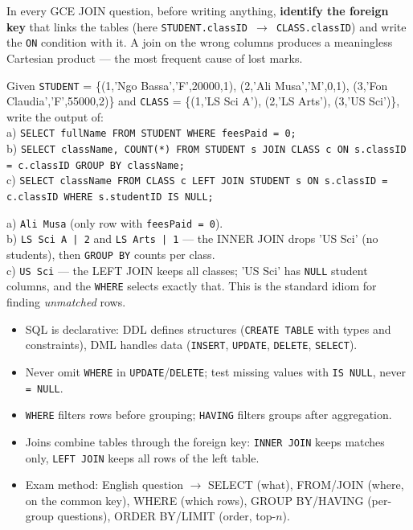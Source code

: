 \documentclass[11pt]{article}
\begin{document}
\begin{attention}
In every GCE JOIN question, before writing anything, \textbf{identify the foreign key} that links the tables (here \texttt{STUDENT.classID $\rightarrow$ CLASS.classID}) and write the \texttt{ON} condition with it. A join on the wrong columns produces a meaningless Cartesian product --- the most frequent cause of lost marks.
\end{attention}

\begin{exercice}
Given \texttt{STUDENT} = \{(1,'Ngo Bassa','F',20000,1), (2,'Ali Musa','M',0,1), (3,'Fon Claudia','F',55000,2)\} and \texttt{CLASS} = \{(1,'LS Sci A'), (2,'LS Arts'), (3,'US Sci')\}, write the output of:\\
a) \texttt{SELECT fullName FROM STUDENT WHERE feesPaid = 0;}\\
b) \texttt{SELECT className, COUNT(*) FROM STUDENT s JOIN CLASS c ON s.classID = c.classID GROUP BY className;}\\
c) \texttt{SELECT className FROM CLASS c LEFT JOIN STUDENT s ON s.classID = c.classID WHERE s.studentID IS NULL;}
\end{exercice}

\begin{corrige}[Exercise 1]
a) \texttt{Ali Musa} (only row with \texttt{feesPaid = 0}).\\
b) \texttt{LS Sci A | 2} and \texttt{LS Arts | 1} --- the INNER JOIN drops 'US Sci' (no students), then \texttt{GROUP BY} counts per class.\\
c) \texttt{US Sci} --- the LEFT JOIN keeps all classes; 'US Sci' has \texttt{NULL} student columns, and the \texttt{WHERE} selects exactly that. This is the standard idiom for finding \emph{unmatched} rows.
\end{corrige}

\begin{aretenir}
\begin{itemize}
\item SQL is declarative: DDL defines structures (\texttt{CREATE TABLE} with types and constraints), DML handles data (\texttt{INSERT}, \texttt{UPDATE}, \texttt{DELETE}, \texttt{SELECT}).
\item Never omit \texttt{WHERE} in \texttt{UPDATE}/\texttt{DELETE}; test missing values with \texttt{IS NULL}, never \texttt{= NULL}.
\item \texttt{WHERE} filters rows before grouping; \texttt{HAVING} filters groups after aggregation.
\item Joins combine tables through the foreign key: \texttt{INNER JOIN} keeps matches only, \texttt{LEFT JOIN} keeps all rows of the left table.
\item Exam method: English question $\rightarrow$ SELECT (what), FROM/JOIN (where, on the common key), WHERE (which rows), GROUP BY/HAVING (per-group questions), ORDER BY/LIMIT (order, top-$n$).
\end{itemize}
\end{aretenir}
\end{document}
